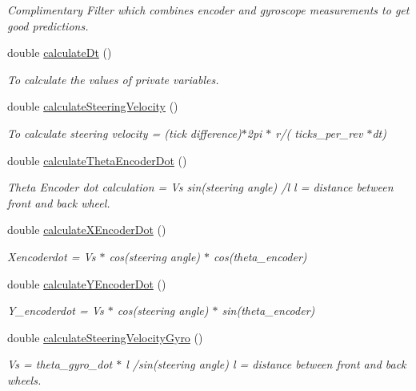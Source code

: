 \begin{DoxyCompactItemize}
\begin{DoxyCompactList}\small\item\em Complimentary Filter which combines encoder and gyroscope measurements to get good predictions. \end{DoxyCompactList}\item 
double \hyperlink{classPoseEstimator_a2e17dfd1a685355806d63dfde8dcb3e1}{calculate\+Dt} ()
\begin{DoxyCompactList}\small\item\em To calculate the values of private variables. \end{DoxyCompactList}\item 
double \hyperlink{classPoseEstimator_acedaa62b4904ba067f3eae3e548e6b91}{calculate\+Steering\+Velocity} ()
\begin{DoxyCompactList}\small\item\em To calculate steering velocity = (tick difference)$\ast$2pi $\ast$ r/( ticks\+\_\+per\+\_\+rev $\ast$dt) \end{DoxyCompactList}\item 
double \hyperlink{classPoseEstimator_a43d3de94f21a171973a904b18eda4490}{calculate\+Theta\+Encoder\+Dot} ()
\begin{DoxyCompactList}\small\item\em Theta Encoder dot calculation = Vs sin(steering angle) /l l = distance between front and back wheel. \end{DoxyCompactList}\item 
double \hyperlink{classPoseEstimator_ab4424670fd33e38b7089e21ee5cd7df4}{calculate\+X\+Encoder\+Dot} ()
\begin{DoxyCompactList}\small\item\em Xencoderdot = Vs $\ast$ cos(steering angle) $\ast$ cos(theta\+\_\+encoder) \end{DoxyCompactList}\item 
double \hyperlink{classPoseEstimator_a825bfdaf2083d30164bf0e64d5bab8e6}{calculate\+Y\+Encoder\+Dot} ()
\begin{DoxyCompactList}\small\item\em Y\+\_\+encoderdot = Vs $\ast$ cos(steering angle) $\ast$ sin(theta\+\_\+encoder) \end{DoxyCompactList}\item 
double \hyperlink{classPoseEstimator_af06d02597df5e14ee608e169942054a9}{calculate\+Steering\+Velocity\+Gyro} ()
\begin{DoxyCompactList}\small\item\em Vs = theta\+\_\+gyro\+\_\+dot $\ast$ l /sin(steering angle) l = distance between front and back wheels. \end{DoxyCompactList}\item 

\end{DoxyCompactItemize}
